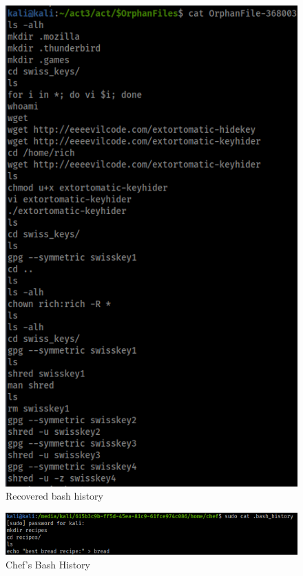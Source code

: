 \documentclass[a4paper,12pt]{article}
\begin{document}
\begin{figure}[H]
	\begin{center}
		\includegraphics[scale = 0.50]{img/act1/bashRecovered.png} 
	\end{center}
	\caption{Recovered bash history}
	\label{recovered}
\end{figure}

\begin{figure}[H]
	\begin{center}
		\includegraphics[scale = 0.55]{img/act1/chefBash.png} 
	\end{center}
	\caption{Chef's Bash History}
	\label{chef}
\end{figure}
\end{document}

